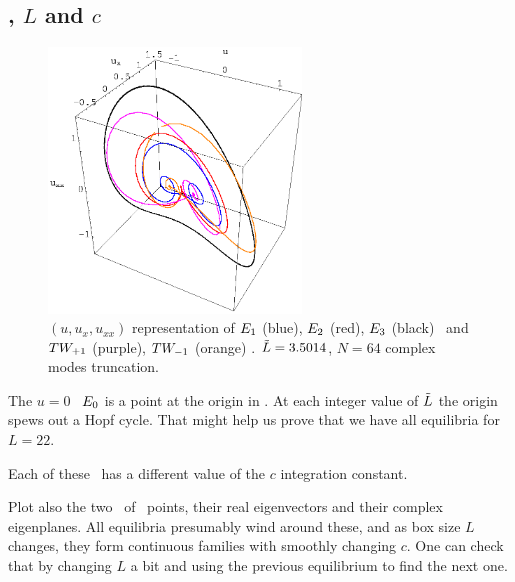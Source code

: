 \subsection{\Eqva, $L$ and $c$}

\begin{figure}[t]
\centering
\includegraphics[width=0.6\textwidth]{figs/equilSpatial.eps}
\caption{
    {\small
$(u,u_x,u_{xx})$ representation
of $E_{1}$ (blue), $E_{2}$ (red), $E_{3}$ (black) \eqva\ and $TW_{+1}$ (purple), $TW_{-1}$ (orange) \reqva.
$\tilde{L}=3.5014$, $N=64$ complex modes truncation.
        } %
        }
\label{f:eqvSpatial}
\end{figure}

The $u=0$  \eqv\ $E_{0}$ is a point at the origin
in .
At
each integer value of $\tilde{L}$ the origin spews out a Hopf cycle. That
might help us prove that we have all equilibria for $L=22$.

Each of these \eqva\ has a different value of the $c$ integration
constant.

Plot also the two \eqva\ of \eqva\ points, their
real eigenvectors and their complex eigenplanes. All equilibria presumably
wind around these, and as box size $L$ changes, they form continuous
families with smoothly changing $c$. One can check that by
changing $L$ a bit and using the previous equilibrium to find the next
one.


